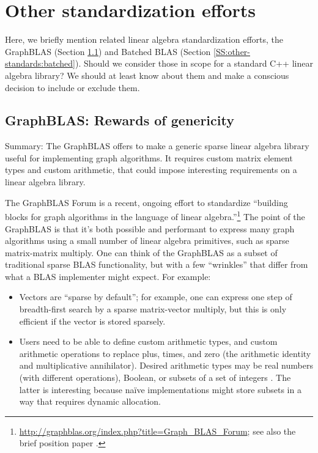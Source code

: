 \section{Other standardization efforts}
\label{S:other-standards}

Here, we briefly mention related linear algebra standardization
efforts, the GraphBLAS (Section \ref{SS:other-standards:GraphBLAS})
and Batched BLAS (Section \ref{SS:other-standards:batched}).  Should
we consider those in scope for a standard C++ linear algebra library?
We should at least know about them and make a conscious decision to
include or exclude them.

\subsection{GraphBLAS: Rewards of genericity}
\label{SS:other-standards:GraphBLAS}

Summary: The GraphBLAS offers to make a generic sparse linear algebra
library useful for implementing graph algorithms.  It requires custom
matrix element types and custom arithmetic, that could impose
interesting requirements on a linear algebra library.

The GraphBLAS Forum is a recent, ongoing effort to standardize
``building blocks for graph algorithms in the language of linear
algebra.''\footnote{\url{http://graphblas.org/index.php?title=Graph_BLAS_Forum};
  see also the brief position paper \cite{mattson2013standards}.}  The
point of the GraphBLAS is that it's both possible and performant to
express many graph algorithms using a small number of linear algebra
primitives, such as sparse matrix-matrix multiply.  One can think of
the GraphBLAS as a subset of traditional sparse BLAS functionality,
but with a few ``wrinkles'' that differ from what a BLAS implementer
might expect.  For example:
\begin{itemize}
\item Vectors are ``sparse by default''; for example, one can express
  one step of breadth-first search by a sparse matrix-vector multiply,
  but this is only efficient if the vector is stored sparsely.
\item Users need to be able to define custom arithmetic types, and
  custom arithmetic operations to replace plus, times, and zero (the
  arithmetic identity and multiplicative annihilator).  Desired
  arithmetic types may be real numbers (with different operations),
  Boolean, or subsets of a set of integers \cite{kepner2016math}.  The
  latter is interesting because na\"ive implementations might store
  subsets in a way that requires dynamic allocation.
\end{itemize}

